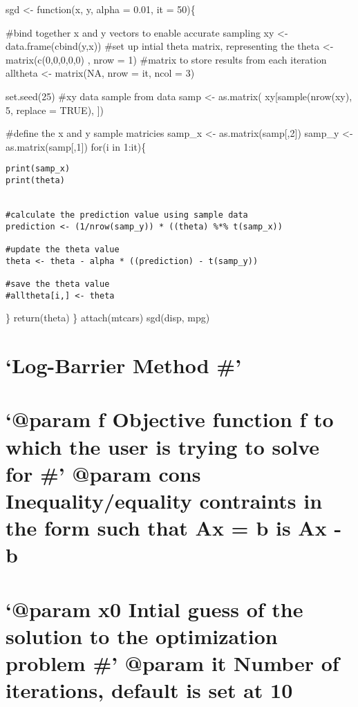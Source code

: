 \documentclass[]{article}
\begin{document}
{{sgd \textless{}- function(x, y, alpha = 0.01, it = 50)\{

\#bind together x and y vectors to enable accurate sampling xy
\textless{}- data.frame(cbind(y,x)) \#set up intial theta matrix,
representing the theta \textless{}- matrix(c(0,0,0,0,0) , nrow = 1)
\#matrix to store results from each iteration alltheta \textless{}-
matrix(NA, nrow = it, ncol = 3)

set.seed(25) \#xy data sample from data samp \textless{}- as.matrix(
xy{[}sample(nrow(xy), 5, replace = TRUE), {]})

\#define the x and y sample matricies samp\_x \textless{}-
as.matrix(samp{[},2{]}) samp\_y \textless{}- as.matrix(samp{[},1{]})
for(i in 1:it)\{

\begin{verbatim}
print(samp_x)
print(theta)


#calculate the prediction value using sample data
prediction <- (1/nrow(samp_y)) * ((theta) %*% t(samp_x))

#update the theta value
theta <- theta - alpha * ((prediction) - t(samp_y))

#save the theta value
#alltheta[i,] <- theta
\end{verbatim}

\} return(theta) \} attach(mtcars) sgd(disp, mpg)

\section{\texorpdfstring{`Log-Barrier Method
\#'}{Log-Barrier Method \#}}\label{log-barrier-method}

\section{\texorpdfstring{`@param f Objective function f to which the
user is trying to solve for \#' @param cons Inequality/equality
contraints in the form such that Ax = b is Ax -
b}{@param f Objective function f to which the user is trying to solve for \# @param cons Inequality/equality contraints in the form such that Ax = b is Ax - b}}\label{param-f-objective-function-f-to-which-the-user-is-trying-to-solve-for-param-cons-inequalityequality-contraints-in-the-form-such-that-ax-b-is-ax---b}

\section{\texorpdfstring{`@param x0 Intial guess of the solution to the
optimization problem \#' @param it Number of iterations, default is set
at
10}{@param x0 Intial guess of the solution to the optimization problem \# @param it Number of iterations, default is set at 10}}\label{param-x0-intial-guess-of-the-solution-to-the-optimization-problem-param-it-number-of-iterations-default-is-set-at-10}

}}
\end{document}
